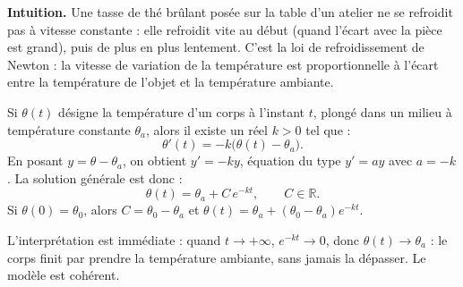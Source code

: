 \documentclass[11pt]{article}
\newcommand{\cle}[1]{{\popxbold\color{popdark}#1}}
\begin{document}
\textbf{Intuition.} Une tasse de thé brûlant posée sur la table d'un atelier ne se refroidit pas à vitesse constante : elle refroidit vite au début (quand l'écart avec la pièce est grand), puis de plus en plus lentement. C'est la \cle{loi de refroidissement de Newton} : la vitesse de variation de la température est proportionnelle à l'écart entre la température de l'objet et la température ambiante.

\begin{propriete}
Si $\theta(t)$ désigne la température d'un corps à l'instant $t$, plongé dans un milieu à température constante $\theta_a$, alors il existe un réel $k>0$ tel que :
\[ \theta'(t)=-k\bigl(\theta(t)-\theta_a\bigr). \]
En posant $y=\theta-\theta_a$, on obtient $y'=-ky$, équation du type $y'=ay$ avec $a=-k$. La solution générale est donc :
\[ \theta(t)=\theta_a+C\,e^{-kt}, \qquad C\in\mathbb{R}. \]
Si $\theta(0)=\theta_0$, alors $C=\theta_0-\theta_a$ et $\theta(t)=\theta_a+(\theta_0-\theta_a)e^{-kt}$.
\end{propriete}

L'interprétation est immédiate : quand $t\to+\infty$, $e^{-kt}\to 0$, donc $\theta(t)\to\theta_a$ : le corps finit par prendre la température ambiante, sans jamais la dépasser. Le modèle est cohérent.
\end{document}
